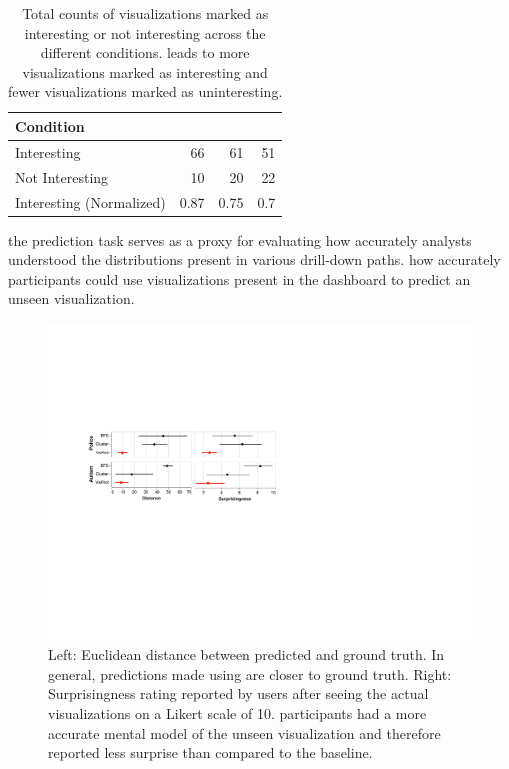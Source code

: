 \begin{table}[h!]
	\centering
	\begin{tabular}{|l|rrr|}
	\hline
	 \small{Condition}             &   \small{\system} &   \small{\BFS} &   \small{\cluster} \\
	\hline
	 \small{Interesting}            &  \cellcolor{blue!25}       66    & 61    &      51   \\
	 \small{Not Interesting}        &  \cellcolor{blue!25}       10    & 20    &      22   \\
	 \small{Interesting (Normalized)} &   \cellcolor{blue!25}       0.87 &  0.75 &       0.7 \\
	\hline
	\end{tabular}
	\caption{Total counts of visualizations marked as interesting or not interesting across the different conditions. \system leads to more visualizations marked as interesting and fewer visualizations marked as uninteresting.}
	\label{table:interestingScore}
\end{table}
\npar {} the prediction task serves as a proxy for evaluating how accurately analysts understood the distributions present in various drill-down paths. how accurately participants could use visualizations present in the dashboard to predict an unseen visualization.
\begin{figure}[h!]
\centering
\includegraphics[width=0.95\linewidth]{figures/prediction_surprisingness_distance.pdf}
\caption{Left: Euclidean distance between predicted and ground truth. In general, predictions made using \system are closer to ground truth. Right: Surprisingness rating reported by users after seeing the actual visualizations on a Likert scale of 10. \system participants had a more accurate mental model of the unseen visualization and therefore reported less surprise than compared to the baseline.}
\label{fig:distance}
\end{figure}
